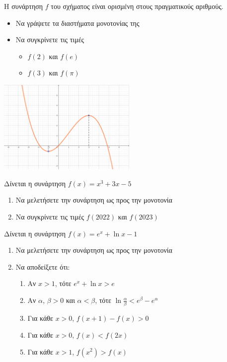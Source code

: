 \documentclass{presentation}
\begin{document}
\begin{askisi}
      Η συνάρτηση $f$ του σχήματος είναι ορισμένη στους πραγματικούς αριθμούς.
      \begin{itemize}
            \item Να γράψετε τα διαστήματα μονοτονίας της
            \item Να συγκρίνετε τις τιμές
                  \begin{itemize}
                        \item $f(2)$ και $f(e)$
                        \item $f(3)$ και $f(\pi)$
                  \end{itemize}
      \end{itemize}
      \centering
      \includegraphics[width=0.5\textwidth]{"images/1.3 Μονοτονία.png"}
\end{askisi}

\begin{askisi}
      Δίνεται η συνάρτηση $f(x)=x^3+3x-5$
      \begin{enumerate}
            \item Να μελετήσετε την συνάρτηση ως προς την μονοτονία \pause
            \item Να συγκρίνετε τις τιμές $f(2022)$ και $f(2023)$
      \end{enumerate}
\end{askisi}

\begin{askisi}
      Δίνεται η συνάρτηση $f(x)=e^x+\ln x-1$
      \begin{enumerate}
            \item Να μελετήσετε την συνάρτηση ως προς την μονοτονία \pause
            \item Να αποδείξετε ότι:
                  \begin{enumerate}
                        \item Αν $x>1$, τότε $e^x+\ln x>e$ \pause
                        \item Αν $α$, $β>0$ και $α<β$, τότε $\ln \frac{α}{β}<e^β-e^α$ \pause
                        \item Για κάθε $x>0$, $f(x+1)-f(x)>0$ \pause
                        \item Για κάθε $x>0$, $f(x)<f(2x)$ \pause
                        \item Για κάθε $x>1$, $f(x^2)>f(x)$
                  \end{enumerate}
      \end{enumerate}
\end{askisi}
\end{document}
